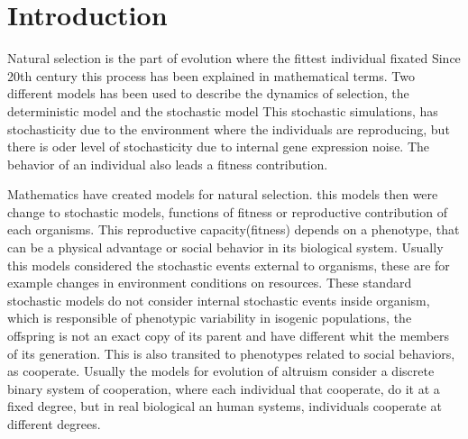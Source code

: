 \renewcommand{\chaptername}{}
\chapter{Introduction}
\ifpdf
    \graphicspath{{Introduction/IntroductionFigs/PNG/}{Introduction/IntroductionFigs/PDF/}{Introduction/IntroductionFigs/}}
\else
    \graphicspath{{Introduction/IntroductionFigs/EPS/}{Introduction/IntroductionFigs/}}
\fi

Natural selection is the part of evolution where the fittest individual fixated 
Since 20th century this process has been explained in mathematical terms.
Two different models has been used to describe the dynamics of selection, the deterministic model and the stochastic model 
This stochastic simulations, has stochasticity due to the environment where the individuals are reproducing, but there is oder level of stochasticity due to internal gene expression noise.
The behavior of an individual also leads a fitness contribution.

Mathematics have created models for natural selection. this models then were change to stochastic models, functions of fitness or reproductive contribution of each organisms. This reproductive capacity(fitness) depends on a phenotype, that can be a physical advantage or social behavior in its biological system.
Usually this models considered the stochastic events external to organisms, these are for example changes in environment conditions on resources. These standard stochastic models do not consider internal stochastic events inside organism, which is responsible  of phenotypic variability in isogenic populations, the offspring is not an exact copy of its parent and have different whit the members of its generation. This is also transited to phenotypes related to social behaviors, as cooperate. Usually the models for evolution of altruism consider a discrete binary system of cooperation, where each  individual that cooperate,  do it at a fixed degree, but in real biological an human systems, individuals cooperate at different degrees.  





